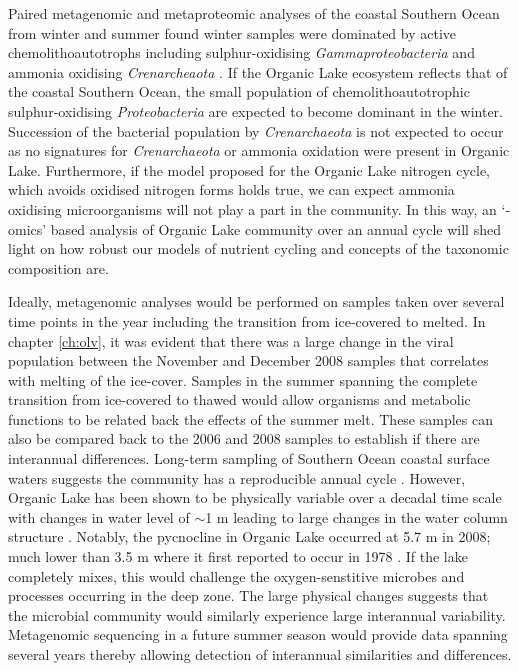 Paired metagenomic and metaproteomic analyses of the coastal Southern Ocean from winter and summer found winter samples were dominated by active chemolithoautotrophs including sulphur-oxidising \emph{Gammaproteobacteria} and ammonia oxidising \emph{Crenarcheaota} \cite{Grzymski2012, Williams2012b}.
If the Organic Lake ecosystem reflects that of the coastal Southern Ocean, the small population of chemolithoautotrophic sulphur-oxidising \emph{Proteobacteria} are expected to become dominant in the winter.
Succession of the bacterial population by \emph{Crenarchaeota} is not expected to occur as no signatures for \emph{Crenarchaeota} or ammonia oxidation were present in Organic Lake.
Furthermore, if the model proposed for the Organic Lake nitrogen cycle, which avoids oxidised nitrogen forms holds true, we can expect ammonia oxidising microorganisms will not play a part in the community.
In this way, an `-omics' based analysis of Organic Lake community over an annual cycle will shed light on how robust our models of nutrient cycling and concepts of the taxonomic composition are.

Ideally, metagenomic analyses would be performed on samples taken over several time points in the year including the transition from ice-covered to melted.
In chapter \ref{ch:olv}, it was evident that there was a large change in the viral population between the November and December 2008 samples  that correlates with melting of the ice-cover. 
Samples in the summer spanning the complete transition from ice-covered to thawed would allow organisms and metabolic functions to be related back the effects of the summer melt.
These samples can also be compared back to the 2006 and 2008 samples to establish if there are interannual differences.
Long-term sampling of Southern Ocean coastal surface waters suggests the community has a reproducible annual cycle \cite{Murray2007}.
However, Organic Lake has been shown to be physically variable over a decadal time scale with changes in water level of $\sim$1 m leading to large changes in the water column structure \cite{Gibson1995, Gibson1996}.
Notably, the pycnocline in Organic Lake occurred at 5.7 m in 2008; much lower than 3.5 m where it first reported to occur in 1978 \cite{Franzmann1987b}.
If the lake completely mixes, this would challenge the oxygen-senstitive microbes and processes occurring in the deep zone.
The large physical changes suggests that the microbial community would similarly experience large interannual variability.
Metagenomic sequencing in a future summer season would provide data spanning several years thereby allowing detection of interannual similarities and differences.

